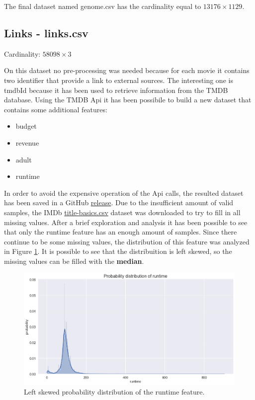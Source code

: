 \documentclass[../main]{subfiles}
\begin{document}
The final dataset named genome.csv has the cardinality equal to $13176 \times 1129$.

\subsection*{Links - links.csv}
Cardinality: $58098 \times 3$

On this dataset no pre-processing was needed because for each movie it contains two identifier that provide a link to external sources.
The interesting one is tmdbId because it has been used to retrieve information from the TMDB database.
Using the TMDB Api it has been possibile to build a new dataset that contains some additional features:
\begin{itemize}
    \item budget
    \item revenue
    \item adult
    \item runtime
\end{itemize}
In order to avoid the expensive operation of the Api calls, the resulted dataset has been saved in a GitHub \href{https://github.com/prushh/movie-lens-mlp/releases/tag/api-dataset}{release}.
Due to the insufficient amount of valid samples, the IMDb \href{https://datasets.imdbws.com/title.basics.tsv.gz}{title-basics.csv} dataset was downloaded to try to fill in all missing values.
After a brief exploration and analysis it has been possible to see that only the runtime feature has an enough amount of samples.
Since there continue to be some missing values, the distribution of this feature was analyzed in Figure \ref{fig:runtime_distribution_missing}.
It is possible to see that the distribuition is left skewed, so the missing values can be filled with the \textbf{median}.

\begin{figure}[h]
    \center
    \includegraphics[width=\linewidth]{figures/runtime_distribution_missing.png}
    \caption{Left skewed probability distribution of the runtime feature.}
    \label{fig:runtime_distribution_missing}
\end{figure}
\end{document}
